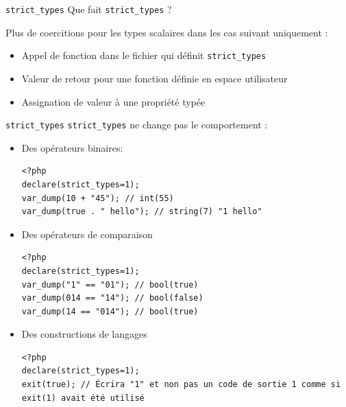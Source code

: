 \documentclass[10pt]{beamer}
\begin{document}
\begin{frame}[fragile]{\texttt{strict\_types}}
    Que fait \texttt{strict\_types} ?
    \pause
    
    Plus de coercitions pour les types scalaires dans les cas suivant \alert{uniquement} :
    \begin{itemize}
        \item Appel de fonction dans le fichier qui définit \texttt{strict\_types}
        \item Valeur de retour pour une fonction définie en espace utilisateur
        \item Assignation de valeur à une propriété typée
    \end{itemize}
\end{frame}
\begin{frame}[fragile]{\texttt{strict\_types}}
    \texttt{strict\_types} ne change \alert{pas} le comportement :

    \begin{itemize}
        \item Des opérateurs binaires:
            \begin{verbatim}
<?php
declare(strict_types=1);
var_dump(10 + "45"); // int(55)
var_dump(true . " hello"); // string(7) "1 hello"
            \end{verbatim}
        \item Des opérateurs de comparaison
            \begin{verbatim}
<?php
declare(strict_types=1);
var_dump("1" == "01"); // bool(true)
var_dump(014 == "14"); // bool(false)
var_dump(14 == "014"); // bool(true)
            \end{verbatim}
        \item Des constructions de langages
            \begin{verbatim}
<?php
declare(strict_types=1);
exit(true); // Écrira "1" et non pas un code de sortie 1 comme si exit(1) avait été utilisé
            \end{verbatim}
    \end{itemize}
\end{frame}
\end{document}
